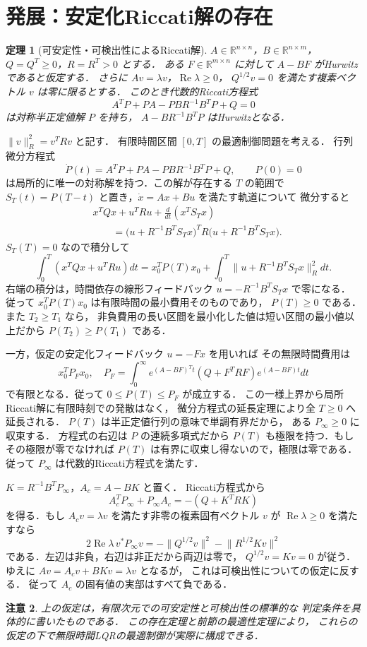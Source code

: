 \documentclass[a5paper,10pt,onecolumn]{jsarticle}
\makeatletter
\theoremstyle{mathnotetheorem}
\newtheorem{theorem}{定理}[section]
\newtheorem{remark}[theorem]{注意}
\renewcommand{\proofname}{証明}
\renewenvironment{proof}[1][\proofname]{%
  \par\pushQED{\qed}\normalfont\topsep4\p@\@plus2\p@\relax
  \trivlist\item[\hskip\labelsep\bfseries #1]\ignorespaces
}{\popQED\endtrivlist\@endpefalse}
\newcommand{\norm}[1]{\lVert #1\rVert}
\makeatother
\begin{document}
\section{発展：安定化Riccati解の存在}
\begin{theorem}[可安定性・可検出性によるRiccati解]
$A\in\mathbb R^{n\times n}$，$B\in\mathbb R^{n\times m}$，
$Q=Q^T\ge0$，$R=R^T>0$ とする．
ある $F\in\mathbb R^{m\times n}$ に対して $A-BF$ がHurwitzであると仮定する．
さらに $Av=\lambda v$，$\operatorname{Re}\lambda\ge0$，
$Q^{1/2}v=0$ を満たす複素ベクトル $v$ は零に限るとする．
このとき代数的Riccati方程式
\[
 A^TP+PA-PBR^{-1}B^TP+Q=0
\]
は対称半正定値解 $P$ を持ち，
$A-BR^{-1}B^TP$ はHurwitzとなる．
\end{theorem}
\begin{proof}
$\|v\|_R^2=v^TRv$ と記す．
有限時間区間 $[0,T]$ の最適制御問題を考える．
行列微分方程式
\[
 \dot P(t)=A^TP+PA-PBR^{-1}B^TP+Q,
 \qquad P(0)=0
\]
は局所的に唯一の対称解を持つ．この解が存在する $T$ の範囲で
$S_T(t)=P(T-t)$ と置き，$\dot x=Ax+Bu$ を満たす軌道について
微分すると
\[
 \begin{aligned}
 &x^TQx+u^TRu+\frac d{dt}(x^TS_Tx)\\
 &\qquad=\bigl(u+R^{-1}B^TS_Tx\bigr)^TR
 \bigl(u+R^{-1}B^TS_Tx\bigr).
 \end{aligned}
\]
$S_T(T)=0$ なので積分して
\[
 \int_0^T(x^TQx+u^TRu)dt
 =x_0^TP(T)x_0+
 \int_0^T\norm{u+R^{-1}B^TS_Tx}_R^2dt.
\]
右端の積分は，時間依存の線形フィードバック
$u=-R^{-1}B^TS_Tx$ で零になる．
従って $x_0^TP(T)x_0$ は有限時間の最小費用そのものであり，
$P(T)\ge0$ である．また $T_2\ge T_1$ なら，
非負費用の長い区間を最小化した値は短い区間の最小値以上だから
$P(T_2)\ge P(T_1)$ である．

一方，仮定の安定化フィードバック $u=-Fx$ を用いれば
その無限時間費用は
\[
 x_0^TP_Fx_0,\quad
 P_F=\int_0^\infty e^{(A-BF)^Tt}
 (Q+F^TRF)e^{(A-BF)t}dt
\]
で有限となる．従って $0\le P(T)\le P_F$ が成立する．
この一様上界から局所Riccati解に有限時刻での発散はなく，
微分方程式の延長定理により全 $T\ge0$ へ延長される．
$P(T)$ は半正定値行列の意味で単調有界だから，
ある $P_\infty\ge0$ に収束する．
方程式の右辺は $P$ の連続多項式だから
$\dot P(T)$ も極限を持つ．もしその極限が零でなければ
$P(T)$ は有界に収束し得ないので，極限は零である．
従って $P_\infty$ は代数的Riccati方程式を満たす．

$K=R^{-1}B^TP_\infty$，$A_c=A-BK$ と置く．
Riccati方程式から
\[
 A_c^TP_\infty+P_\infty A_c=-(Q+K^TRK)
\]
を得る．もし $A_cv=\lambda v$ を満たす非零の複素固有ベクトル $v$ が
$\operatorname{Re}\lambda\ge0$ を満たすなら
\[
 2\operatorname{Re}\lambda\,v^*P_\infty v
 =-\norm{Q^{1/2}v}^2-\norm{R^{1/2}Kv}^2
\]
である．左辺は非負，右辺は非正だから両辺は零で，
$Q^{1/2}v=Kv=0$ が従う．ゆえに
$Av=A_cv+BKv=\lambda v$ となるが，
これは可検出性についての仮定に反する．
従って $A_c$ の固有値の実部はすべて負である．
\end{proof}
\begin{remark}
上の仮定は，有限次元での可安定性と可検出性の標準的な
判定条件を具体的に書いたものである．
この存在定理と前節の最適性定理により，
これらの仮定の下で無限時間LQRの最適制御が実際に構成できる．
\end{remark}
\end{document}
